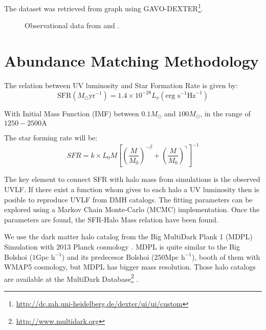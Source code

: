 \documentclass{emulateapj}
\begin{document}
The dataset was retrieved from \cite{McLure09} graph using
GAVO-DEXTER\footnote{\url{http://dc.zah.uni-heidelberg.de/dexter/ui/ui/custom}}.




\begin{figure}
\caption{Observational data from \cite{Bouwens15,McLure09}and \cite{Willott13}.}
\label{graph_observational_data}
\end{figure}


\section{Abundance Matching Methodology}
\label{sec:methodology}

The relation between UV luminosity and Star Formation Rate
\citep{madau98,kennicutt98} 
is given by:
\begin{equation}
 \textrm{SFR}\left(M_\odot \textrm{yr}^{-1}\right) 
      = 1.4 \times 10^{-28} L_{\nu} \left( \textrm{erg s}^{-1}\textrm{Hz}^{-1} 
	\right)
\end{equation}


  With Initial Mass Function (IMF) between $0.1 M_\odot$ 
 and $100 M_\odot$, in the range of $1250-2500 \mathring{\textrm{A}} $

The star forming rate will be:
  \begin{equation}
  SFR = k \times L_{0} M \left[ \left( \frac{M}{M_0}\right)^{-\beta} 
		   + \left( \frac{M}{M_0}\right)^{\gamma} 
               \right]^{-1}
  \end{equation}

The key element to connect SFR with halo mass from simulations is the observed UVLF. 
If there exist a function whom gives to each halo a UV luminosity then is posible to 
reproduce UVLF from DMH catalogs. The fitting parameters can be explored using a 
Markov Chain Monte-Carlo (MCMC) implementation. Once the parameters are found, 
the SFR-Halo Mass relation have been found.

We use the dark matter halo catalog from the Big MultiDark Plank 1 (MDPL) Simulation 
\citep{Klypin14} with 2013 Planck cosmology \citep{Planck1}. MDPL is quite similar to the 
Big Bolshoi ($1 \textrm{Gpc h}^{-1}$) \citep{Prada12} and 
its predecesor Bolshoi \citep{klypin11} ($250 \textrm{Mpc h}^{-1}$), booth of them with 
WMAP5 cosmology, but MDPL has bigger mass resolution.  Those halo catalogs are 
available at the MultiDark Database\footnote{\url{http://www.multidark.org}} 
\citep{riebe13}.
\end{document}
